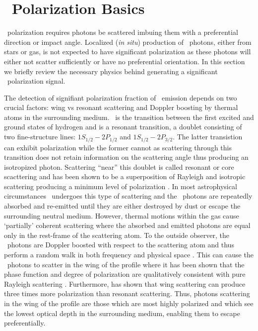 \section{\lya~Polarization Basics}\label{sec: theory}
\lya~polarization requires photons be scattered imbuing them with a preferential direction or impact angle. Localized (\textit{in situ}) production of \lya~photons, either from stars or gas, is not expected to have significant polarization as these photons will either not scatter sufficiently or have no preferential orientation. In this section we briefly review the necessary physics behind generating a significant \lya~polarization signal. 

The detection of signifiant polarization fraction of \lya~emission depends on two crucial factors: wing vs resonant scattering and Doppler boosting by thermal atoms in the surrounding medium. \lya~is the transition between the first excited and ground states of hydrogen and is a resonant transition, a doublet consisting of two fine-structure lines: $1S_{1/2} - 2P_{1/2}$ and $1S_{1/2}-2P_{3/2}$. The latter transistion can exhibit polarization while the former cannot as scattering through this transition does not retain information on the scattering angle thus producing an isotropized photon. Scattering ``near'' this doublet is called resonant or core scacttering and has been shown to be a superposition of Rayleigh and isotropic scattering producing a minimum level of polarization \citep{Brandt1959, Brasken1998}.  In most astrophysical circumstances \lya~undergoes this type of scattering and the \lya~photons are repeatedly absorbed and re-emitted until they are either destroyed by dust or escape the surrounding neutral medium. However, thermal motions within the gas cause  `partially' coherent scattering where the absorbed and emitted photons are equal only in the rest-frame of the scattering atom. To the outside observer, the \lya~photons  are Doppler boosted with respect to the scattering atom and thus perform a random walk in both frequency and physical space \citep{Neufeld1990, LoebRybicki1999}.  This can cause the \lya~photons to scatter in the wing of the profile where it has been shown that the phase function and degree of polarization are qualitatively consistent with pure Rayleigh scattering \citep{Stenflo1980}. Furthermore, \cite{Stenflo1980} has shown that wing scattering can produce three times more polarization than resonant scattering.  Thus, photons scattering in the wing of the profile are those which are most highly polarized and which see the lowest optical depth in the surrounding medium, enabling them to escape preferentially.


